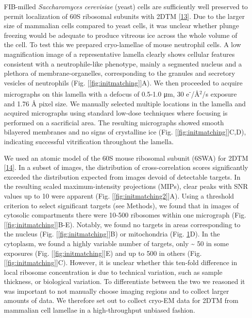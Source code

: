 \documentclass[
]{article}
\begin{document}
FIB-milled \emph{Saccharomyces cerevisiae} (yeast) cells are sufficiently well preserved to permit localization of 60S ribosomal subunits with 2DTM {[}\protect\hyperlink{ref-T1Qr0xyP}{13}{]}. Due to the larger size of mammalian cells compared to yeast cells, it was unclear whether plunge freezing would be adequate to produce vitreous ice across the whole volume of the cell. To test this we prepared cryo-lamellae of mouse neutrophil cells. A low magnification image
of a representative lamella clearly shows cellular features consistent with a
neutrophile-like phenotype, mainly a segmented nucleus and a plethora of
membrane-organelles, corresponding to the granules and secretory vesicles of
neutrophils (Fig. {[}\ref{fig:initmatching}{]}A). We then proceeded to acquire
micrographs on this lamella with a defocus of 0.5-1.0 μm, 30 e\textsuperscript{-}/Å\(^2\)/s
exposure and 1.76 Å pixel size. We manually selected multiple locations in the
lamella and acquired micrographs using standard low-dose techniques where
focusing is performed on a sacrificial area. The resulting micrographs showed
smooth bilayered membranes and no signs of crystalline ice (Fig.
{[}\ref{fig:initmatching}{]}C,D), indicating successful vitrification throughout the
lamella.

We used an atomic model of the 60S mouse ribosomal subunit (6SWA) for 2DTM {[}\protect\hyperlink{ref-sbkam02a}{14}{]}. In a
subset of images, the distribution of cross-correlation scores significantly
exceeded the distribution expected from images devoid of detectable targets. In the
resulting scaled maximum-intensity projections (MIPs), clear peaks with SNR
values up to 10 were apparent (Fig. {[}\ref{fig:initmatching2}{]}A). Using a
threshold criterion to select significant targets (see Methods), we found that in
images of cytosolic compartments there were 10-500 ribosomes within one micrograph
(Fig. {[}\ref{fig:initmatching}{]}B-E). Notably, we found no targets in areas
corresponding to the nucleus (Fig. {[}\ref{fig:initmatching}{]}B) or mitochondria
(Fig. \protect\hyperlink{fig:initmatching}{1}D). In the cytoplasm, we found a highly variable
number of targets, only \textasciitilde{} 50 in some exposures (Fig. {[}\ref{fig:initmatching}{]}E) and
up to 500 in others (Fig. {[}\ref{fig:initmatching}{]}C). However, it is unclear whether this ten-fold difference in local ribosome concentration is due to technical variation, such as sample thickness, or biological variation. To differentiate between the two we reasoned it was important to not manually choose imaging regions and to collect larger amounts of data. We therefore set out to collect cryo-EM data for 2DTM from mammalian cell lamellae in a high-throughput unbiased fashion.
\end{document}
